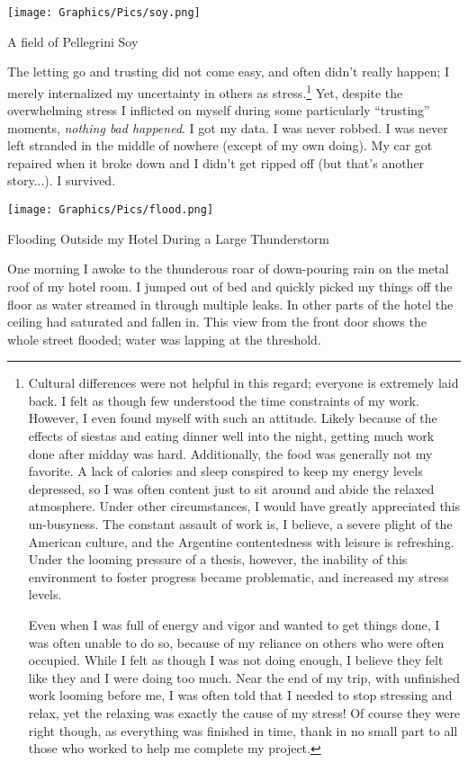 \begin{ssfigure}
  \centering
  \texttt{[image: Graphics/Pics/soy.png]}
  \caption{A field of Pellegrini Soy}
  \label{pic:soy}
\end{ssfigure}

The letting go and trusting did not come easy, and often didn’t really happen; I merely internalized my uncertainty in others as stress.\footnote{Cultural differences were not helpful in this regard; everyone is extremely laid back. I felt as though few understood the time constraints of my work. However, I even found myself with such an attitude. Likely because of the effects of siestas and eating dinner well into the night, getting much work done after midday was hard. Additionally, the food was generally not my favorite. A lack of calories and sleep conspired to keep my energy levels depressed, so I was often content just to sit around and abide the relaxed atmosphere. Under other circumstances, I would have greatly appreciated this un-busyness. The constant assault of work is, I believe, a severe plight of the American culture, and the Argentine contentedness with leisure is refreshing. Under the looming pressure of a thesis, however, the inability of this environment to foster progress became problematic, and increased my stress levels.

Even when I was full of energy and vigor and wanted to get things done, I was often unable to do so, because of my reliance on others who were often occupied. While I felt as though I was not doing enough, I believe they felt like they and I were doing too much. Near the end of my trip, with unfinished work looming before me, I was often told that I needed to stop stressing and relax, yet the relaxing was exactly the cause of my stress! Of course they were right though, as everything was finished in time, thank in no small part to all those who worked to help me complete my project.} Yet, despite the overwhelming stress I inflicted on myself during some particularly ``trusting'' moments, \textit{nothing bad happened}. I got my data. I was never robbed. I was never left stranded in the middle of nowhere (except of my own doing). My car got repaired when it broke down and I didn't get ripped off (but that's another story...). I survived.

\begin{ssfigure}
  \centering
  \texttt{[image: Graphics/Pics/flood.png]}
  \caption{Flooding Outside my Hotel During a Large Thunderstorm}
  \label{pic:flood}
  \medskip
  \small
  One morning I awoke to the thunderous roar of down-pouring rain on the metal roof of my hotel room. I jumped out of bed and quickly picked my things off the floor as water streamed in through multiple leaks. In other parts of the hotel the ceiling had saturated and fallen in. This view from the front door shows the whole street flooded; water was lapping at the threshold.
\end{ssfigure}

